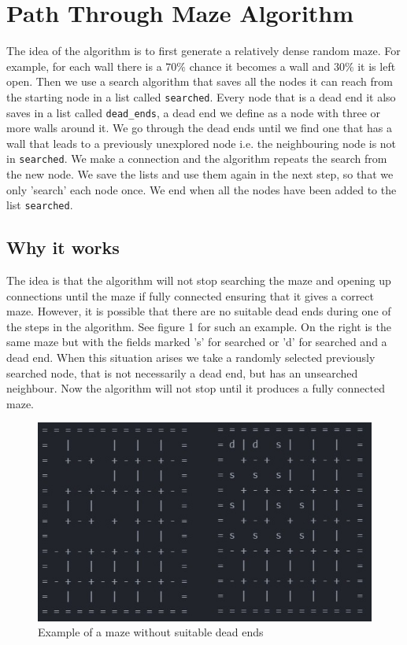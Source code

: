 \documentclass[10pt, a4paper, twoside]{amsart}
\newcommand{\1}{\mathbbm{1}}
\begin{document}
\section{Path Through Maze Algorithm}
The idea of the algorithm is to first generate a relatively dense random maze. For example, for each wall there is a $70\%$ chance it becomes a wall and $30\%$ it is left open. Then we use a search algorithm that saves all the nodes it can reach from the starting node in a list called \verb+searched+. Every node that is a dead end it also saves in a list called \verb+dead_ends+, a dead end we define as a node with three or more walls around it. We go through the dead ends until we find one that has a wall that leads to a previously unexplored node i.e. the neighbouring node is not in \verb+searched+. We make a connection and the algorithm repeats the search from the new node. We save the lists and use them again in the next step, so that we only 'search' each node once. We end when all the nodes have been added to the list \verb+searched+.

\subsection{Why it works}
The idea is that the algorithm will not stop searching the maze and opening up connections until the maze if fully connected ensuring that it gives a correct maze. However, it is possible that there are no suitable dead ends during one of the steps in the algorithm. See figure 1 for such an example. On the right is the same maze but with the fields marked 's' for searched or 'd' for searched and a dead end. When this situation arises we take a randomly selected previously searched node, that is not necessarily a dead end, but has an unsearched neighbour. Now the algorithm will not stop until it produces a fully connected maze.

\begin{figure}
\centering
        \includegraphics[totalheight=8cm]{nodeadends}
    \caption{Example of a maze without suitable dead ends}
\end{figure}
\end{document}
